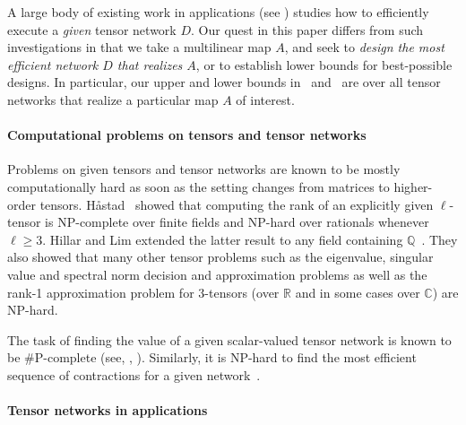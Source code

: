 \documentclass{toc}
\begin{document}
A large body of existing work in applications
(see ) %
studies
how to efficiently execute a \emph{given} tensor network $D$.
Our quest in this paper differs from such
%
investigations  %
in that
we %
take  %
a multilinear map $A$, and seek to
\emph{design the most efficient network $D$ that realizes $A$},
or to establish lower bounds for best-possible designs.
In particular, our upper and lower bounds in~
and~ are over all tensor networks that 
realize a particular map $A$ of interest.

\paragraph*{Computational problems on tensors and tensor networks}

Problems on given tensors and tensor networks are known to be mostly
computationally hard as soon as the setting changes from matrices to
higher-order tensors.
H\aa{}stad~\cite{Hastad1990} showed that computing the rank of
an explicitly given $\ell$-tensor is NP-complete over finite fields
and NP-hard over rationals whenever $\ell\geq 3$. Hillar and Lim extended the latter result to any field containing $\mathbb{Q}$~\cite{HillarL2013}. They also showed that many other tensor problems such as the eigenvalue, singular value and spectral norm decision and approximation problems as well as
the  %
rank-1 approximation problem for 3-tensors (over $\mathbb{R}$ and in some cases over $\mathbb{C}$) are NP-hard.

The task of finding the value of a given scalar-valued tensor network
is known to be $\#$P-complete (see, \eg, 
\cite{BacchusDP2003,BiamonteMT2015}).
Similarly, it is NP-hard to find the most efficient sequence of contractions
for a given network~\cite{LamSW1997,PfeiferHV2014}.

\paragraph*{Tensor networks in applications}
\end{document}
